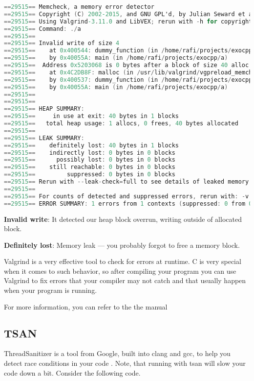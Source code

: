 \begin{lstlisting}[language=C]
==29515== Memcheck, a memory error detector
==29515== Copyright (C) 2002-2015, and GNU GPL'd, by Julian Seward et al.
==29515== Using Valgrind-3.11.0 and LibVEX; rerun with -h for copyright info
==29515== Command: ./a
==29515==
==29515== Invalid write of size 4
==29515==    at 0x400544: dummy_function (in /home/rafi/projects/exocpp/a)
==29515==    by 0x40055A: main (in /home/rafi/projects/exocpp/a)
==29515==  Address 0x5203068 is 0 bytes after a block of size 40 alloc'd
==29515==    at 0x4C2DB8F: malloc (in /usr/lib/valgrind/vgpreload_memcheck-amd64-linux.so)
==29515==    by 0x400537: dummy_function (in /home/rafi/projects/exocpp/a)
==29515==    by 0x40055A: main (in /home/rafi/projects/exocpp/a)
==29515==
==29515==
==29515== HEAP SUMMARY:
==29515==     in use at exit: 40 bytes in 1 blocks
==29515==   total heap usage: 1 allocs, 0 frees, 40 bytes allocated
==29515==
==29515== LEAK SUMMARY:
==29515==    definitely lost: 40 bytes in 1 blocks
==29515==    indirectly lost: 0 bytes in 0 blocks
==29515==      possibly lost: 0 bytes in 0 blocks
==29515==    still reachable: 0 bytes in 0 blocks
==29515==         suppressed: 0 bytes in 0 blocks
==29515== Rerun with --leak-check=full to see details of leaked memory
==29515==
==29515== For counts of detected and suppressed errors, rerun with: -v
==29515== ERROR SUMMARY: 1 errors from 1 contexts (suppressed: 0 from 0)
\end{lstlisting}

\textbf{Invalid write}: It detected our heap block overrun, writing outside of allocated block.

\textbf{Definitely lost}: Memory leak --- you probably forgot to free a memory block.

Valgrind is a very effective tool to check for errors at runtime. C is very special when it comes to such behavior, so after compiling your program you can use Valgrind to fix errors that your compiler may not catch and that usually happen when your program is running.

For more information, you can refer to the the manual \cite{valgrind}

\subsection{TSAN}

ThreadSanitizer is a tool from Google, built into clang and gcc, to help you detect race conditions in your code \cite{threadsanitizercppmanual_2018}.
Note, that running with tsan will slow your code down a bit. Consider the following code.

